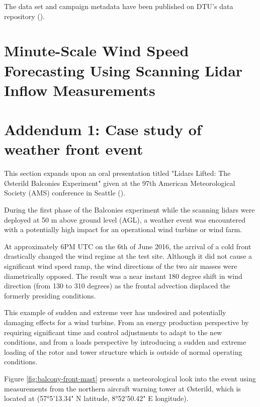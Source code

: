 \noindent
The data set and campaign metadata have been published on DTU's data repository (\cite{balcony_dataset}).

\clearpage
\section{Minute-Scale Wind Speed Forecasting Using Scanning Lidar Inflow Measurements}
\label{sec:balcony_paper}



\clearpage
\section{Addendum 1: Case study of weather front event}
\label{sec:balcony_addendum1}

This section expands upon an oral presentation titled "Lidars Lifted: The {\O}sterild Balconies Experiment" given at the 97th American Meteorological Society (AMS) conference in Seattle (\cite{simon_lidars_lifted_2017}).

During the first phase of the Balconies experiment while the scanning lidars were deployed at 50 m above ground level (AGL),
a weather event was encountered with a potentially high impact for an operational wind turbine or wind farm.

At approximately 6PM UTC on the 6th of June 2016, the arrival of a cold front drastically changed the wind regime at the test site. Although it did not cause a significant wind speed ramp, the wind directions of the two air masses were diametrically opposed. The result was a near instant 180 degree shift in wind direction (from 130 to 310 degrees) as the frontal advection displaced the formerly presiding conditions. 

This example of sudden and extreme veer has undesired and potentially damaging effects for a wind turbine. From an energy production perspective by requiring significant time and control adjustments to adapt to the new conditions, and from a loads perspective by introducing a sudden and extreme loading of the rotor and tower structure which is outside of normal operating conditions.

Figure \ref{fig:balcony-front-mast} presents a meteorological look into the event using measurements from the northern aircraft warning tower at {\O}sterild, which is located at (57°5'13.34" N latitude, 8°52'50.42" E longitude).

